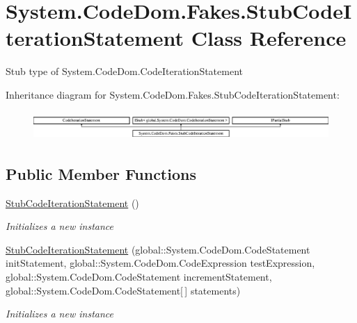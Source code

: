 \hypertarget{class_system_1_1_code_dom_1_1_fakes_1_1_stub_code_iteration_statement}{\section{System.\-Code\-Dom.\-Fakes.\-Stub\-Code\-Iteration\-Statement Class Reference}
\label{class_system_1_1_code_dom_1_1_fakes_1_1_stub_code_iteration_statement}
}


Stub type of System.\-Code\-Dom.\-Code\-Iteration\-Statement 


Inheritance diagram for System.\-Code\-Dom.\-Fakes.\-Stub\-Code\-Iteration\-Statement\-:\begin{figure}[H]
\begin{center}
\leavevmode
\includegraphics[height=1.091618cm]{class_system_1_1_code_dom_1_1_fakes_1_1_stub_code_iteration_statement}
\end{center}
\end{figure}
\subsection*{Public Member Functions}
\begin{DoxyCompactItemize}
\item 
\hyperlink{class_system_1_1_code_dom_1_1_fakes_1_1_stub_code_iteration_statement_aa2380372fe4b1366b15d64697b78ba1b}{Stub\-Code\-Iteration\-Statement} ()
\begin{DoxyCompactList}\small\item\em Initializes a new instance\end{DoxyCompactList}\item 
\hyperlink{class_system_1_1_code_dom_1_1_fakes_1_1_stub_code_iteration_statement_acad54bf17ad7237d6703a2ed4419c072}{Stub\-Code\-Iteration\-Statement} (global\-::\-System.\-Code\-Dom.\-Code\-Statement init\-Statement, global\-::\-System.\-Code\-Dom.\-Code\-Expression test\-Expression, global\-::\-System.\-Code\-Dom.\-Code\-Statement increment\-Statement, global\-::\-System.\-Code\-Dom.\-Code\-Statement\mbox{[}$\,$\mbox{]} statements)
\begin{DoxyCompactList}\small\item\em Initializes a new instance\end{DoxyCompactList}\end{DoxyCompactItemize}
